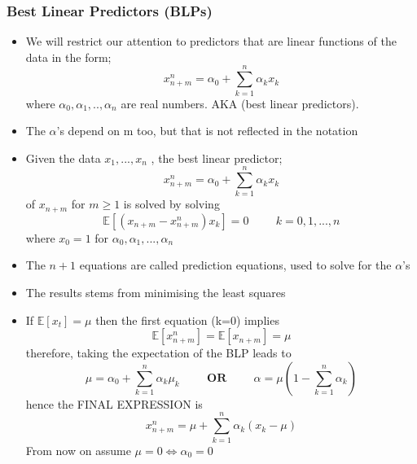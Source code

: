 \documentclass{article}
\begin{document}
\subsubsection{Best Linear Predictors (BLPs)}
\begin{itemize}
    \item We will restrict our attention to predictors that are linear functions of the data in the form;
    \begin{equation*}
        x_{n+m}^n = \alpha_0 + \sum_{k=1}^n \alpha_k x_k
    \end{equation*}
    where $\alpha_0, \alpha_1, .., \alpha_n$ are real numbers. AKA (best linear predictors).
    \item The $\alpha$'s depend on m too, but that is not reflected in the notation
    \item Given the data $x_1,...,x_n$ , the best linear predictor;
    \begin{equation*}
        x_{n+m}^n = \alpha_0 + \sum_{k=1}^n \alpha_k x_k
    \end{equation*}
    of $x_{n+m}$ for $m \geq 1$ is solved by solving
    \begin{equation*}
        \mathbb{E}[(x_{n+m} - x_{n+m}^n)x_k] = 0 \hspace{1cm } k = 0,1,...,n
    \end{equation*}
    where $x_0 = 1$ for $\alpha_0, \alpha_1, ..., \alpha_n$
    \item The $n+1$ equations are called prediction equations, used to solve for the $\alpha$'s
    \item The results stems from minimising the least squares
\end{itemize}

\begin{itemize}
    \item If $\mathbb{E}[x_t] = \mu$ then the first equation (k=0) implies
    \begin{equation*}
        \mathbb{E}[x_{n+m}^n] = \mathbb{E}[x_{n+m}] = \mu
    \end{equation*}
    therefore, taking the expectation of the BLP leads to 
    \begin{equation*}
        \mu = \alpha_0 + \sum_{k=1} ^n \alpha_k \mu_k \hspace{1cm} \textbf{OR} \hspace{1cm} \alpha = \mu(1 - \sum_{k=1}^n \alpha_k )
    \end{equation*}
    hence the FINAL EXPRESSION is
    \begin{equation*}
        x_{n+m}^n = \mu + \sum_{k=1}^n \alpha_k (x_k - \mu)
    \end{equation*}
    From now on assume $\mu = 0 \Leftrightarrow \alpha_0 = 0$
\end{itemize}
\end{document}
